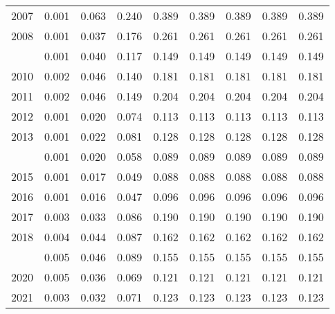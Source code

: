 \documentclass[
]{article}
\begin{document}
\begin{longtable}[t]{lrrrrrrrr}
2007 & 0.001 & 0.063 & 0.240 & 0.389 & 0.389 & 0.389 & 0.389 & 0.389\\
2008 & 0.001 & 0.037 & 0.176 & 0.261 & 0.261 & 0.261 & 0.261 & 0.261\\
\addlinespace
2009 & 0.001 & 0.040 & 0.117 & 0.149 & 0.149 & 0.149 & 0.149 & 0.149\\
2010 & 0.002 & 0.046 & 0.140 & 0.181 & 0.181 & 0.181 & 0.181 & 0.181\\
2011 & 0.002 & 0.046 & 0.149 & 0.204 & 0.204 & 0.204 & 0.204 & 0.204\\
2012 & 0.001 & 0.020 & 0.074 & 0.113 & 0.113 & 0.113 & 0.113 & 0.113\\
2013 & 0.001 & 0.022 & 0.081 & 0.128 & 0.128 & 0.128 & 0.128 & 0.128\\
\addlinespace
2014 & 0.001 & 0.020 & 0.058 & 0.089 & 0.089 & 0.089 & 0.089 & 0.089\\
2015 & 0.001 & 0.017 & 0.049 & 0.088 & 0.088 & 0.088 & 0.088 & 0.088\\
2016 & 0.001 & 0.016 & 0.047 & 0.096 & 0.096 & 0.096 & 0.096 & 0.096\\
2017 & 0.003 & 0.033 & 0.086 & 0.190 & 0.190 & 0.190 & 0.190 & 0.190\\
2018 & 0.004 & 0.044 & 0.087 & 0.162 & 0.162 & 0.162 & 0.162 & 0.162\\
\addlinespace
2019 & 0.005 & 0.046 & 0.089 & 0.155 & 0.155 & 0.155 & 0.155 & 0.155\\
2020 & 0.005 & 0.036 & 0.069 & 0.121 & 0.121 & 0.121 & 0.121 & 0.121\\
2021 & 0.003 & 0.032 & 0.071 & 0.123 & 0.123 & 0.123 & 0.123 & 0.123\\*
\end{longtable}
\end{document}
